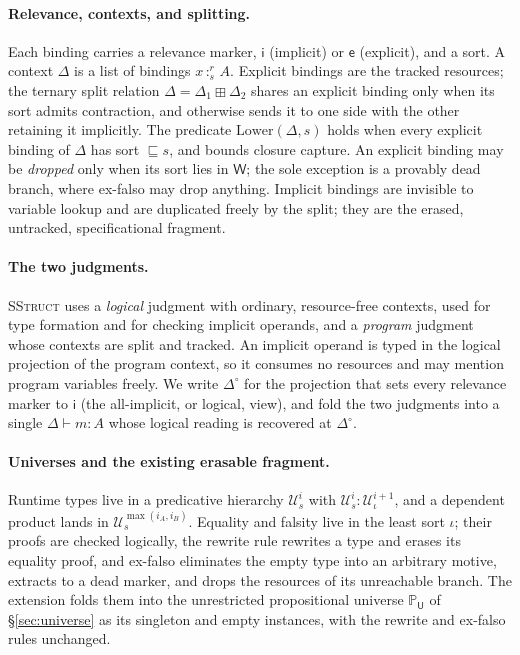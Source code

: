 \documentclass[11pt]{article}
\newcommand{\Wk}{\mathsf{W}}
\newcommand{\sle}{\sqsubseteq}
\newcommand{\Ty}[2]{\mathcal{U}^{#2}_{#1}}       %
\newcommand{\Prop}[1]{\mathbb{P}_{#1}}            %
\newcommand{\im}{\mathsf{i}}                      %
\newcommand{\ex}{\mathsf{e}}                      %
\newcommand{\bind}[3]{#1\,{:}^{#2}_{#3}\,}        %
\newcommand{\spv}[1]{#1^{\circ}}                  %
\newcommand{\msum}{\boxplus}                       %
\newcommand{\smdsh}{\mathrel{\vdash}}
\theoremstyle{definition}
\theoremstyle{plain}
\begin{document}
\paragraph{Relevance, contexts, and splitting.}
Each binding carries a relevance marker, $\im$ (implicit) or $\ex$ (explicit), and
a sort. A context $\Delta$ is a list of bindings $\bind{x}{r}{s}A$. Explicit
bindings are the tracked resources; the ternary split relation
$\Delta=\Delta_1\msum\Delta_2$ shares an explicit binding only when its sort
admits contraction, and otherwise sends it to one side with the other retaining
it implicitly. The predicate $\mathrm{Lower}(\Delta,s)$ holds when every explicit
binding of $\Delta$ has sort $\sle s$, and bounds closure capture. An explicit
binding may be \emph{dropped} only when its sort lies in $\Wk$; the sole
exception is a provably dead branch, where ex-falso may drop anything. Implicit
bindings are invisible to variable lookup and are duplicated freely by the split;
they are the erased, untracked, specificational fragment.

\paragraph{The two judgments.}
\textsc{SStruct} uses a \emph{logical} judgment with ordinary, resource-free
contexts, used for type formation and for checking implicit operands, and a
\emph{program} judgment whose contexts are split and tracked. An implicit operand
is typed in the logical projection of the program context, so it consumes no
resources and may mention program variables freely. We write $\spv{\Delta}$ for
the projection that sets every relevance marker to $\im$ (the all-implicit, or
logical, view), and fold the two judgments into a single $\Delta\smdsh m:A$
whose logical reading is recovered at $\spv{\Delta}$.

\paragraph{Universes and the existing erasable fragment.}
Runtime types live in a predicative hierarchy $\Ty{s}{i}$ with $\Ty{s}{i} :
\Ty{\iota}{i+1}$, and a dependent product lands in $\Ty{s}{\max(i_A,i_B)}$.
Equality and falsity live in the least sort $\iota$; their proofs are checked
logically, the rewrite rule rewrites a type and erases its equality proof, and
ex-falso eliminates the empty type into an arbitrary motive, extracts to a dead
marker, and drops the resources of its unreachable branch. The extension folds
them into the unrestricted propositional universe $\Prop{\mathsf{U}}$ of
\S\ref{sec:universe} as its singleton and empty instances, with the rewrite and
ex-falso rules unchanged.
\end{document}
